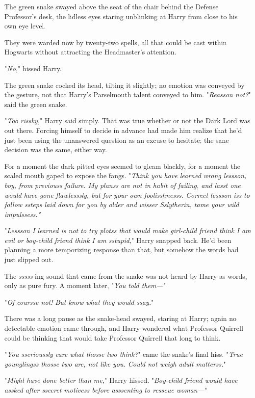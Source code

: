 The green snake swayed above the seat of the chair behind the Defense Professor's desk, the lidless eyes staring unblinking at Harry from close to his own eye level.

They were warded now by twenty-two spells, all that could be cast within Hogwarts without attracting the Headmaster's attention.

"\emph{No,}" hissed Harry.

The green snake cocked its head, tilting it slightly; no emotion was conveyed by the gesture, not that Harry's Parselmouth talent conveyed to him. "\emph{Reasson not?}" said the green snake.

"\emph{Too rissky,}" Harry said simply. That was true whether or not the Dark Lord was out there. Forcing himself to decide in advance had made him realize that he'd just been using the unanswered question as an excuse to hesitate; the sane decision was the same, either way.

For a moment the dark pitted eyes seemed to gleam blackly, for a moment the scaled mouth gaped to expose the fangs. "\emph{Think you have learned wrong lessson, boy, from previouss failure. My planss are not in habit of failing, and lasst one would have gone flawlesssly, but for your own foolisshnesss. Correct lessson iss to follow ssteps laid down for you by older and wisser Sslytherin, tame your wild impulssess."}

"\emph{Lessson I learned is not to try plotss that would make girl-child friend think I am evil or boy-child friend think I am sstupid,}" Harry snapped back. He'd been planning a more temporizing response than that, but somehow the words had just slipped out.

The \emph{sssss}-ing sound that came from the snake was not heard by Harry as words, only as pure fury. A moment later, "\emph{You told them---}"

"\emph{Of coursse not! But know what they would ssay.}"

There was a long pause as the snake-head swayed, staring at Harry; again no detectable emotion came through, and Harry wondered what Professor Quirrell could be thinking that would take Professor Quirrell that long to think.

"\emph{You sserioussly care what thosse two think?}" came the snake's final hiss. "\emph{True younglingss thosse two are, not like you. Could not weigh adult matterss.}"

"\emph{Might have done better than me,}" Harry hissed. "\emph{Boy-child friend would have assked after ssecret motivess before asssenting to resscue woman---}"

